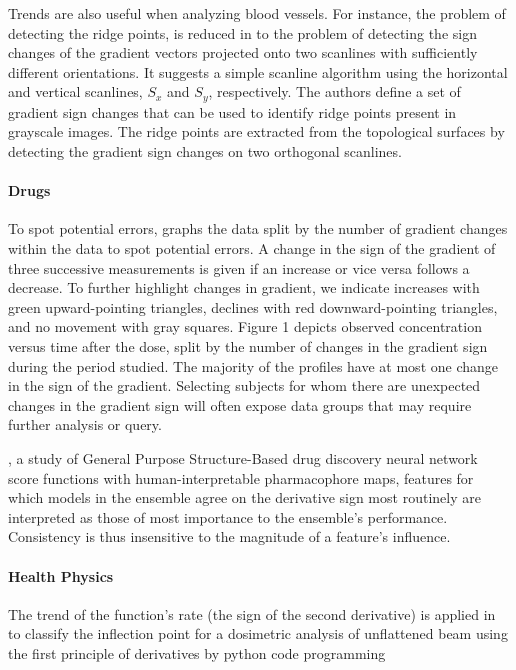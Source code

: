 \documentclass[11pt]{book}
\begin{document}
Trends are also useful when analyzing blood vessels. For instance, the problem of
detecting the ridge points, is reduced in \cite{croasmun2012fast}
to the problem of detecting the sign changes of the gradient vectors
projected onto two scanlines with sufficiently different orientations.
It suggests a simple scanline algorithm using the horizontal and vertical
scanlines, $S_{x}$ and $S_{y}$, respectively. The authors define
a set of gradient sign changes that can be used to identify ridge
points present in grayscale images. The ridge points are extracted
from the topological surfaces by detecting the gradient sign changes
on two orthogonal scanlines.


\paragraph{Drugs}

To spot potential errors, \cite{dykstra2010visualization} graphs
the data split by the number of gradient changes within the data to
spot potential errors. A change in the sign of the gradient of three
successive measurements is given if an increase or vice versa follows
a decrease. To further highlight changes in gradient, we indicate
increases with green upward-pointing triangles, declines with red
downward-pointing triangles, and no movement with gray squares. Figure
1 depicts observed concentration versus time after the dose, split
by the number of changes in the gradient sign during the period studied.
The majority of the profiles have at most one change in the sign of
the gradient. Selecting subjects for whom there are unexpected changes
in the gradient sign will often expose data groups that may require
further analysis or query.

\cite{brown2021general}, a study of General Purpose Structure-Based drug discovery neural network
score functions with human-interpretable pharmacophore maps, features for which models in the ensemble
agree on the derivative sign most routinely are interpreted as those
of most importance to the ensemble's performance. Consistency is
thus insensitive to the magnitude of a feature's influence.


\paragraph{Health Physics}

The trend of the function's rate (the sign of the second derivative)
is applied in \cite{shende2019determination} to classify the inflection
point for a dosimetric analysis of unflattened beam using the first principle of derivatives
by python code programming
\end{document}
